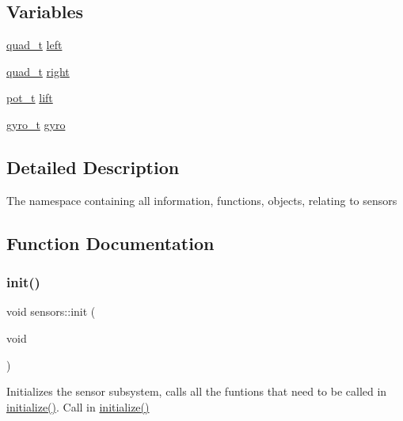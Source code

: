 \subsection*{Variables}
\begin{DoxyCompactItemize}
\item 
\hyperlink{structsensors_1_1quad__t}{quad\+\_\+t} \hyperlink{namespacesensors_aa9b039f7a72fdb7faf156b830ca76772}{left}
\item 
\hyperlink{structsensors_1_1quad__t}{quad\+\_\+t} \hyperlink{namespacesensors_a06fce5712cbec0620a46dcf679f03e43}{right}
\item 
\hyperlink{structsensors_1_1pot__t}{pot\+\_\+t} \hyperlink{namespacesensors_a846dce2ebdbd35cd6abdbd3173dfb289}{lift}
\item 
\hyperlink{classsensors_1_1gyro__t}{gyro\+\_\+t} \hyperlink{namespacesensors_ad1473b3f557dd776bed79a4a739559e3}{gyro}
\end{DoxyCompactItemize}


\subsection{Detailed Description}
The namespace containing all information, functions, objects, relating to sensors 

\subsection{Function Documentation}
\mbox{\label{namespacesensors_a044693d89baff38c98f863ee503cde2e}} 
\subsubsection{\texorpdfstring{init()}{init()}}
{\footnotesize\ttfamily void sensors\+::init (\begin{DoxyParamCaption}\item[{void}]{ }\end{DoxyParamCaption})}

Initializes the sensor subsystem, calls all the funtions that need to be called in \hyperlink{main_8h_a25a40b6614565f755233080a384c35f1}{initialize()}. Call in \hyperlink{main_8h_a25a40b6614565f755233080a384c35f1}{initialize()} \mbox{\label{namespacesensors_a5d5bcadf00164a9db189d9bfa8d9dbb3}} 
